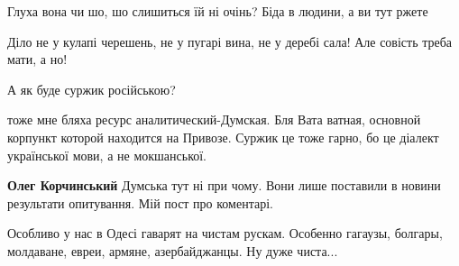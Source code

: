 Глуха вона чи шо, шо слишиться їй ні очінь? Біда в людини, а ви тут ржете


 

Діло не у кулапі черешень, не у пугарі вина, не у деребі сала! Але совість
треба мати, а но!


 

А як буде суржик російською?

 

тоже мне бляха ресурс аналитический-Думская. Бля Вата ватная, основной корпункт
которой находится на Привозе. Суржик це тоже гарно, бо це діалект української
мови, а не мокшанської.

\begin{itemize}
 
\textbf{Олег Корчинський} Думська тут ні при чому. Вони лише поставили в новини результати опитування. Мій пост про коментарі.
\end{itemize}

 

Особливо у нас в Одесі гаварят на чистам рускам. Особенно гагаузы, болгары, молдаване, евреи, армяне, азербайджанцы.
Ну дуже чиста...

